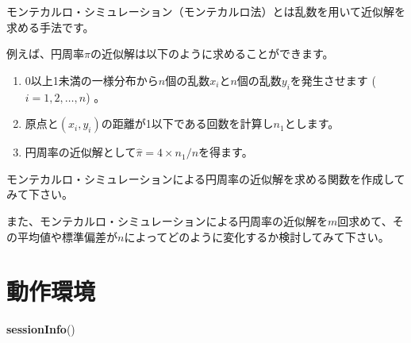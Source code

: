 \documentclass[]{bxjsarticle}
\newenvironment{Shaded}{\begin{snugshade}}{\end{snugshade}}
\newcommand{\KeywordTok}[1]{\textcolor[rgb]{0.13,0.29,0.53}{\textbf{#1}}}
\newcommand{\NormalTok}[1]{#1}
\providecommand{\tightlist}{%
  \setlength{\itemsep}{0pt}\setlength{\parskip}{0pt}}
\begin{document}
モンテカルロ・シミュレーション（モンテカルロ法）とは乱数を用いて近似解を求める手法です。

例えば、円周率\(\pi\)の近似解は以下のように求めることができます。

\begin{enumerate}
\def\labelenumi{\arabic{enumi}.}
\tightlist
\item
  0以上1未満の一様分布から\(n\)個の乱数\(x_i\)と\(n\)個の乱数\(y_i\)を発生させます (\(i = 1,2,\ldots,n\)) 。
\item
  原点と\((x_i,y_i)\)の距離が1以下である回数を計算し\(n_1\)とします。
\item
  円周率の近似解として\(\hat{\pi} = 4 \times n_1/n\)を得ます。
\end{enumerate}

モンテカルロ・シミュレーションによる円周率の近似解を求める関数を作成してみて下さい。

また、モンテカルロ・シミュレーションによる円周率の近似解を\(m\)回求めて、その平均値や標準偏差が\(n\)によってどのように変化するか検討してみて下さい。

\hypertarget{environment}{%
\section*{動作環境}\label{environment}}

\begin{Shaded}
\begin{Highlighting}[]
\KeywordTok{sessionInfo}\NormalTok{()}
\end{Highlighting}
\end{Shaded}
\end{document}
